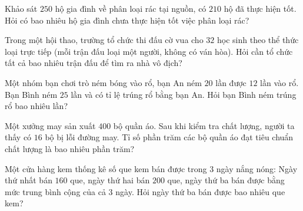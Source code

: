 \begin{ex} %
Khảo sát $250$ hộ gia đình về phân loại rác tại nguồn, có $210$ hộ đã thực hiện tốt. Hỏi có bao nhiêu hộ gia đình chưa thực hiện tốt việc phân loại rác?
\end{ex}

\begin{ex} %
Trong một hội thao, trường tổ chức thi đấu cờ vua cho $32$ học sinh theo thể thức loại trực tiếp (mỗi trận đấu loại một người, không có ván hòa). Hỏi cần tổ chức tất cả bao nhiêu trận đấu để tìm ra nhà vô địch?
\end{ex}

\begin{ex} %
Một nhóm bạn chơi trò ném bóng vào rổ, bạn An ném $20$ lần được $12$ lần vào rổ. Bạn Bình ném $25$ lần và có tỉ lệ trúng rổ bằng bạn An. Hỏi bạn Bình ném trúng rổ bao nhiêu lần?
\end{ex}

\begin{ex} %
Một xưởng may sản xuất $400$ bộ quần áo. Sau khi kiểm tra chất lượng, người ta thấy có $16$ bộ bị lỗi đường may. Tỉ số phần trăm các bộ quần áo đạt tiêu chuẩn chất lượng là bao nhiêu phần trăm?
\end{ex}

\begin{ex} %
Một cửa hàng kem thống kê số que kem bán được trong $3$ ngày nắng nóng: Ngày thứ nhất bán $160$ que, ngày thứ hai bán $200$ que, ngày thứ ba bán được bằng mức trung bình cộng của cả $3$ ngày. Hỏi ngày thứ ba bán được bao nhiêu que kem?
\end{ex}
